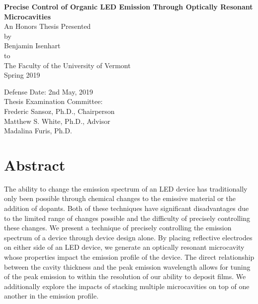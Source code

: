 \documentclass{report}
\author{Benjamin Isenhart}
\begin{document}
\begin{titlepage}
	\begin{center}
		\vspace{1cm}
		\Huge
		\textbf{Precise Control of Organic LED Emission Through Optically Resonant Microcavities}\\
		\vspace{1.5cm}
		\LARGE
		An Honors Thesis Presented\\
		by\\
		Benjamin Isenhart\\
		to\\
		The Faculty of the University of Vermont\\
		\vspace{0.5cm}
		Spring 2019
		\vspace{2cm}
	\end{center}
	\begin{flushright}
		\Large
		Defense Date: 2nd May, 2019\\
		Thesis Examination Committee:\\
		\vspace{0.5cm}
		Frederic Sansoz, Ph.D., Chairperson\\
		Matthew S. White, Ph.D., Advisor\\
		Madalina Furis, Ph.D.\\
	\end{flushright}
\end{titlepage}

\chapter*{Abstract}
The ability to change the emission spectrum of an LED device has traditionally only been possible through chemical changes to the emissive material or the addition of dopants. Both of these techniques have significant disadvantages due to the limited range of changes possible and the difficulty of precisely controlling these changes. We present a technique of precisely controlling the emission spectrum of a device through device design alone. By placing reflective electrodes on either side of an LED device, we generate an optically resonant microcavity whose properties impact the emission profile of the device. The direct relationship between the cavity thickness and the peak emission wavelength allows for tuning of the peak emission to within the resolution of our ability to deposit films. We additionally explore the impacts of stacking multiple microcavities on top of one another in the emission profile.
\end{document}
